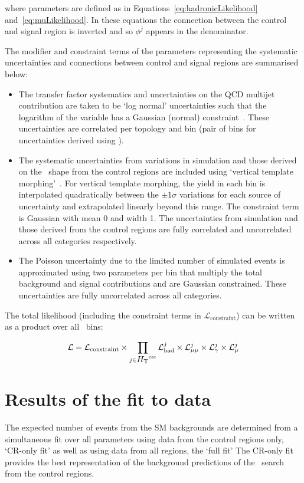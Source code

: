 \noindent where parameters are defined as in Equations~\ref{eq:hadronicLikelihood} and~\ref{eq:muLikelihood}. 
In these equations the connection between the control and signal region is inverted
and so $\phi^{j}$ appears in the denominator. 

The modifier and constraint terms of the parameters representing the systematic uncertainties and 
connections between control and signal regions are summarised below:

\begin{itemize}
\item The transfer factor systematics and uncertainties on the QCD multijet contribution 
are taken to be `log normal' uncertainties such that the logarithm of the variable has 
a Gaussian (normal) constraint~\cite{templateMorphing}. These uncertainties are correlated per topology and \scalht bin 
(pair of \scalht bins for uncertainties derived using \mmj).
\item The systematic uncertainties from variations in simulation and those derived on the \mht~shape from the control regions 
are included using `vertical template morphing'~\cite{templateMorphing}. For vertical template morphing, the yield
in each bin is interpolated quadratically between the $\pm 1\sigma$ variations for each source of
uncertainty and extrapolated linearly beyond this range. The constraint term is Gaussian
with mean 0 and width 1. The uncertainties from simulation and those derived from the control regions
are fully correlated and uncorrelated across all categories respectively.
\item The Poisson uncertainty due to the limited number of simulated events is approximated using
two parameters per bin that multiply the total background and signal contributions and 
are Gaussian constrained. These uncertainties are fully uncorrelated across all categories.
\end{itemize}

The total likelihood (including the constraint terms in $\mathcal{L}_\mathrm{constraint}$) 
can be written as a product over all \htcat~bins:

\begin{equation}
\label{eq:totalLikelihood}
\mathcal{L} =  \mathcal{L}_\mathrm{constraint} \times \prod_{j\in\mbox{$H_\text{T}$}^{\text{cat}}} \mathcal{L}^{j}_{\mathrm{had}} \times \mathcal{L}^{j}_{\mathrm{\mu\mu}} 
\times \mathcal{L}^{j}_{\mathrm{\gamma}} \times \mathcal{L}^{j}_{\mathrm{\mu}}
\end{equation}


\section{Results of the fit to data}
\label{sec:results}
The expected number of events from the SM backgrounds are determined from 
a simultaneous fit over all parameters using data from the control regions only, `CR-only fit' 
as well as using data from all regions, the `full fit'  The CR-only fit provides the 
best representation of the background predictions of the \alphat~search from the control regions.


